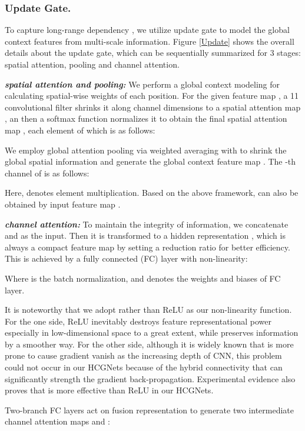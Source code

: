 \documentclass[letterpaper]{article}
\begin{document}
 	
 	\subsubsection{Update Gate.}To capture long-range dependency , we utilize update gate to model the global context features from multi-scale information. Figure \ref{Update} shows the overall details about the update gate, which can be sequentially summarized for 3 stages: spatial attention, pooling and channel attention. 
 	
 	\textbf{\emph{spatial attention and pooling:}} We perform a global context modeling for calculating spatial-wise weights of each position. For the given feature map , a 11 convolutional filter shrinks it along channel dimensions to a spatial attention map , an then a softmax function normalizes it to obtain the final spatial attention map , each element of which is as follows:
 	
 	We employ global attention pooling via weighted averaging with  to shrink the global spatial information and generate the global context feature map . The -th channel of  is as follows:  
 	
 	Here,  denotes element multiplication. Based on the above framework,  can also be obtained by input feature map .
 	
 	\textbf{\emph{channel attention:}} To maintain the integrity of information, we concatenate  and  as the input. Then it is transformed to a hidden representation , which is always a compact feature map by setting a reduction ratio  for better efficiency. This is achieved by a fully connected (FC) layer with non-linearity:  
 	
 	Where  is the batch normalization,  and  denotes the weights and biases of FC layer.
 	
 	It is noteworthy that we adopt  rather than ReLU as our non-linearity function. For the one side, ReLU inevitably destroys feature representational power especially in low-dimensional space to a great extent, while  preserves information by a smoother way. For the other side, although it is widely known that  is more prone to cause gradient vanish as the increasing depth of CNN, this problem could not occur in our HCGNets because of the hybrid connectivity that can significantly strength the gradient back-propagation. Experimental evidence also proves that  is more effective than ReLU in our HCGNets. 
 	
 	Two-branch FC layers act on fusion representation  to generate two intermediate channel attention maps  and :
 	
\end{document}
